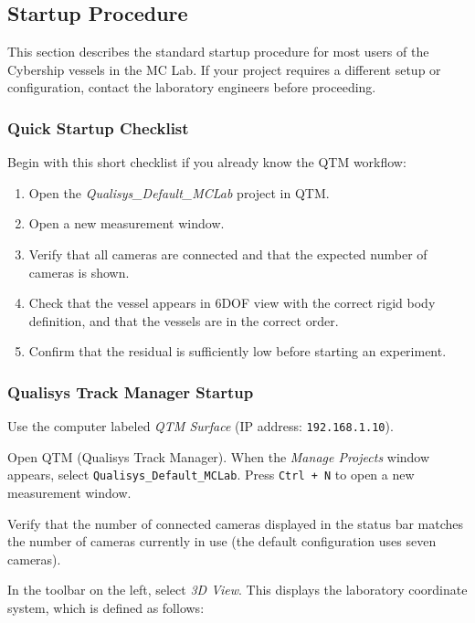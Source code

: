 \documentclass[12pt,a4paper]{article}
\begin{document}
	\subsection{Startup Procedure}
	
	This section describes the standard startup procedure for most users of the Cybership vessels in the MC Lab. If your project requires a different setup or configuration, contact the laboratory engineers before proceeding.
	
	\subsubsection{Quick Startup Checklist}
	
	Begin with this short checklist if you already know the QTM workflow:
	
	\begin{enumerate}
		\item[$\square$] Open the \textit{Qualisys\_Default\_MCLab} project in QTM.
		\item[$\square$] Open a new measurement window.
		\item[$\square$] Verify that all cameras are connected and that the expected number of cameras is shown.
		\item[$\square$] Check that the vessel appears in 6DOF view with the correct rigid body definition, and that the vessels are in the correct order. 
		\item[$\square$] Confirm that the residual is sufficiently low before starting an experiment.
	\end{enumerate}
	
	\subsubsection{Qualisys Track Manager Startup}
	
	Use the computer labeled \textit{QTM Surface} (IP address: \texttt{192.168.1.10}).
	
	Open QTM (Qualisys Track Manager). When the \textit{Manage Projects} window appears, select \texttt{Qualisys\_Default\_MCLab}. Press \texttt{Ctrl + N} to open a new measurement window.
	
	Verify that the number of connected cameras displayed in the status bar matches the number of cameras currently in use (the default configuration uses seven cameras).
	
	In the toolbar on the left, select \textit{3D View}. This displays the laboratory coordinate system, which is defined as follows:
	
\end{document}

